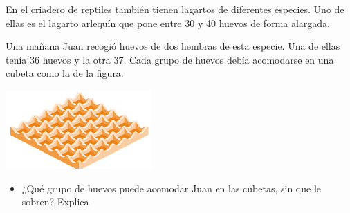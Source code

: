 \documentclass[10pt,twoside]{article}
\begin{document}
\begin{minipage}[]{.55\textwidth}
En el criadero de reptiles también tienen lagartos de diferentes especies. Uno de ellas es el lagarto arlequín que pone entre 30 y 40 huevos de forma alargada.

Una mañana Juan recogió huevos de dos hembras de esta especie. Una de ellas tenía 36 huevos y la otra 37. Cada grupo de huevos debía acomodarse en una cubeta como la de la figura. 
\end{minipage} \hfill
\begin{minipage}{.35\textwidth}
 \begin{center}
 \includegraphics{./Images/cubeta.png}
\end{center}
\end{minipage}
\begin{itemize}
 \item ¿Qué grupo de huevos puede acomodar Juan en las cubetas,
sin que le sobren? Explica
\end{itemize}
\end{document}
